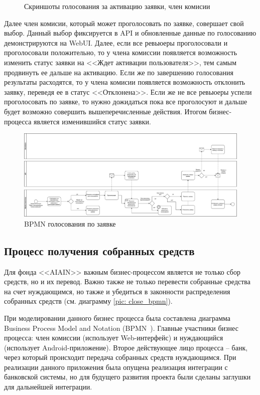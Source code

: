 \documentclass[a4paper,12pt,reqno]{article}
\begin{document}
\begin{figure}[H]
\begin{subfigure}[b]{0.475\linewidth}
		\end{subfigure}
		\caption{Скриншоты голосования за активацию заявки, член комисии}
		\label{pic: vote}
\end{figure}
	
Далее член комисии, который может проголосовать по заявке, совершает свой выбор. Данный выбор фиксируется в API и обновленные данные по голосованию демонстрируются на WebUI. Далее, если все ревьюеры проголосовали и проголосовали положительно, то у члена комиссии появляется возможность изменить статус заявки на <<Ждет активации пользователя>>, тем самым продвинуть ее дальше на активацию. Если же по завершению голосования результаты расходятся, то у члена комисии появляется возможность отклонить заявку, переведя ее в статус <<Отклонена>>. Если же не все ревьюеры успели проголосовать по заявке, то нужно дожидаться пока все проголосуют и дальше будет возможно совершить вышеперечисленные действия. Итогом бизнес-процесса является изменившийся статус заявки. 
	
\begin{figure}[H]
		\centering
		\includegraphics[width = \linewidth]{img/vote_flow.pdf}
		\caption{BPMN голосования по заявке}
		\label{pic: vote_flow}
\end{figure}

\subsection{Процесс получения собранных средств}

Для фонда <<AIAIN>> важным бизнес-процессом является не только сбор средств, но и их перевод. Важно также не только перевести собранные средства на счет нуждающимся, но также и убедиться в законности распределения собранных средств (см. диаграмму \ref{pic: close_bpmn}). 

При моделировании данного бизнес процесса была составлена диаграмма Business Process Model and Notation (BPMN~\cite{bpmn}). Главные участники бизнес процесса: член комиссии (использует Web-интерфейс) и нуждающийся (использует Android-приложение). Второе действующее лицо процесса -- банк, через который происходит передача собранных средств нуждающимся. При реализации данного приложения была опущена реализация интеграции с банковской системы, но для будущего развития проекта были сделаны заглушки для дальнейшей интеграции. 
\end{document}

